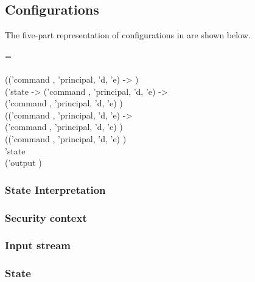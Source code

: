 \documentclass[../../main/main.tex]{subfiles}
\begin{document}
\subsection{Configurations}
The five-part representation of configurations in  are shown below.


\begin{tabbing}
\parskip=8pt
 = \\
\hspace{0.3cm}     \\
\hspace{0.5cm}  (('command , 'principal, 'd, 'e)  -> )\\
\hspace{0.5cm}    ('state -> ('command , 'principal, 'd, 'e)   -> \\
\hspace{0.5cm}    ('command , 'principal, 'd, 'e)  ) \\
 \hspace{0.5cm}   (('command , 'principal, 'd, 'e)   -> \\
\hspace{0.5cm}    ('command , 'principal, 'd, 'e)  ) \\
 \hspace{0.5cm}  (('command , 'principal, 'd, 'e)   ) \\
\hspace{0.5cm}   'state \\
\hspace{0.5cm} ('output )
\parskip=18pt
\end{tabbing}

\subsubsection{State Interpretation}
\subsubsection{Security context}
\subsubsection{Input stream}
\subsubsection{State}
\end{document}
